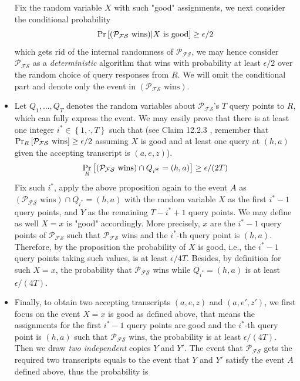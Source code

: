 \documentclass{article}
\begin{document}
\begin{itemize}
Fix the random variable $X$ with such "good" assignments, we next consider the conditional probability
\begin{equation*}
\operatorname{Pr} \left[  (\mathcal{P_{FS}} \text{ wins}) \vert X \text{ is good}\right] \geq \epsilon/2
\end{equation*}
which gets rid of the internal randomness of $\mathcal{P_{FS}}$, we may hence consider $\mathcal{P_{FS}}$ as a \textit{deterministic} algorithm that wins with probability at least $\epsilon/2$ over the random choice of query responses from $R$. We will omit the conditional part and denote only the event in $ (\mathcal{P_{FS}} \text{ wins})$.
\item Let $Q_1, \dots, Q_T$ denotes the random variables about $\mathcal{P_{FS}}$'s $T$ query points to $R$, which can fully express the event. We may easily prove that there is at least one integer $i^{\displaystyle *} \in \left\{ 1, \cdot, T \right\}$ such that (see Claim 12.2.3 \cite{ThalerBookZKP}, remember that $\mathop{\operatorname{Pr}}_R \left[ \mathcal{P_{FS}} \text{ wins} \right] \geq \epsilon/2$ assuming $X$ is good and at least one query at $(h, a)$ given the accepting transcript is $(a, e, z)$).
\begin{equation*}
\mathop{\operatorname{Pr}}_R \left[ (\mathcal{P_{FS}} \text{ wins}) \cap Q_{i^{\displaystyle *}} = (h, a) \right] \geq \epsilon/(2T)
\end{equation*}
Fix such $i^{\displaystyle *}$, apply the above proposition again to the event $A$ as $(\mathcal{P_{FS}} \text{ wins}) \cap Q_{i^{\displaystyle *}} = (h, a)$ with the random variable $X$ as the first $i^{\displaystyle *} - 1$ query points, and $Y$ as the remaining $T - i^{\displaystyle *} + 1$ query points. We may define as well $X = x$ is "good" accordingly. More precisely, $x$ are the $i^{\displaystyle *} - 1$ query points of $\mathcal{P_{FS}}$ such that $\mathcal{P_{FS}}$ wins and the $i^{\displaystyle *}$-th query point is $(h, a)$. Therefore, by the proposition the probability of $X$ is good, i.e., the $i^{\displaystyle *} - 1$ query points taking such values, is at least $\epsilon/4T$. Besides, by definition for such $X = x$, the probability that $\mathcal{P_{FS}}$ wins while $Q_{i^{\displaystyle *}} = (h, a)$ is at least $\epsilon/(4T)$. 
\item Finally, to obtain two accepting transcripts $(a, e, z)$ and $(a, e', z')$, we first focus on the event $X = x$ is good as defined above, that means the assignments for the first $i^{\displaystyle *} - 1$ query points are good and the $i^{\displaystyle *}$-th query point is $(h, a)$ such that $\mathcal{P_{FS}} \text{ wins}$, the probability is at least $\epsilon/(4T)$. Then we draw \textit{two independent} copies $Y$ and $Y'$. The event that $\mathcal{P_{FS}}$ gets the required two transcripts equals to the event that $Y$ and $Y'$ satisfy the event $A$ defined above, thus the probability is

\end{itemize}
\end{document}
